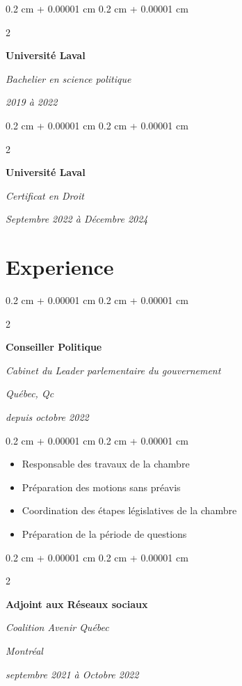 \documentclass[10pt, letterpaper]{article}
\newenvironment{highlights}{
    \begin{itemize}[
        topsep=0.10 cm,
        parsep=0.10 cm,
        partopsep=0pt,
        itemsep=0pt,
        leftmargin=0.4 cm + 10pt
    ]
}{
    \end{itemize}
} %
\newenvironment{onecolentry}{
    \begin{adjustwidth}{
        0.2 cm + 0.00001 cm
    }{
        0.2 cm + 0.00001 cm
    }
}{
    \end{adjustwidth}
} %
\newenvironment{twocolentry}[2][]{
    \onecolentry
    \def\secondColumn{#2}
    \setcolumnwidth{\fill, 4.5 cm}
    \begin{paracol}{2}
}{
    \switchcolumn \raggedleft \secondColumn
    \end{paracol}
    \endonecolentry
} %
\begin{document}
        \begin{twocolentry}{
            
            
        \textit{2019 à 2022}}
            \textbf{Université Laval}

            \textit{Bachelier en science politique }
        \end{twocolentry}
        
\begin{twocolentry}{
            
            
        \textit{Septembre 2022 à Décembre 2024}}
            \textbf{Université Laval}

            \textit{Certificat en Droit}
        \end{twocolentry}
        
    \section{Experience}



        
        \begin{twocolentry}{
        \textit{Québec, Qc}    
            
        \textit{depuis octobre 2022}}
            \textbf{Conseiller Politique}
            
            \textit{Cabinet du Leader parlementaire du gouvernement}
        \end{twocolentry}

        \vspace{0.10 cm}
        \begin{onecolentry}
            \begin{highlights}
                \item Responsable des travaux de la chambre 
                \item Préparation des motions sans préavis
                \item Coordination des étapes législatives de la chambre
                \item Préparation de la période de questions
            \end{highlights}
        \end{onecolentry}


        \vspace{0.2 cm}

        \begin{twocolentry}{
        \textit{Montréal}    
            
        \textit{septembre 2021 à Octobre 2022}}
            \textbf{Adjoint aux Réseaux sociaux}
            
            \textit{Coalition Avenir Québec}
        \end{twocolentry}
\end{document}
